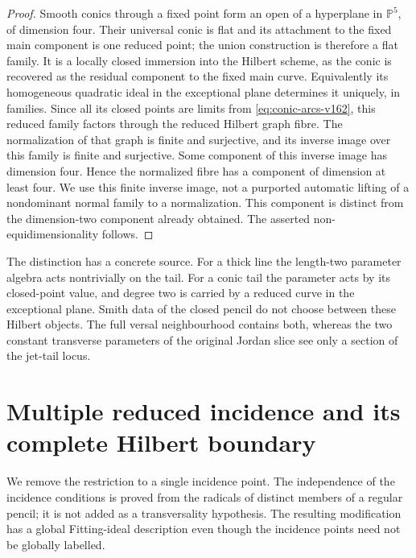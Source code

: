 \documentclass[11pt,reqno]{amsart}
\numberwithin{equation}{section}
\theoremstyle{definition}\newtheorem{definition}[theorem]{Definition}
\theoremstyle{remark}\newtheorem{remark}[theorem]{Remark}
\newcommand{\Pj}{\mathbb P}\newcommand{\A}{\mathbb A}
\begin{document}
\begin{proof}
Smooth conics through a fixed point form an open of a hyperplane
in $\Pj^5$, of dimension four. Their universal conic is flat and
its attachment to the fixed main component is one reduced point;
the union construction is therefore a flat family. It is a locally
closed immersion into the Hilbert scheme, as the conic is recovered
as the residual component to the fixed main curve. Equivalently its
homogeneous quadratic ideal in the exceptional plane determines it
uniquely, in families. Since all its closed points are limits from
\eqref{eq:conic-arcs-v162}, this reduced family factors through the
reduced Hilbert graph fibre. The normalization of that graph is
finite and surjective, and its inverse image over this family is
finite and surjective. Some component of this inverse image has
dimension four. Hence the normalized fibre has a component of
dimension at least four. We use this finite inverse image, not a
purported automatic lifting of a nondominant normal family to a
normalization. This component is distinct from the dimension-two
component already obtained. The asserted non-equidimensionality
follows.
\end{proof}

The distinction has a concrete source. For a thick line the length-two
parameter algebra acts nontrivially on the tail. For a conic tail the
parameter acts by its closed-point value, and degree two is carried
by a reduced curve in the exceptional plane. Smith data of the closed
pencil do not choose between these Hilbert objects. The full versal
neighbourhood contains both, whereas the two constant transverse
parameters of the original Jordan slice see only a section of the
jet-tail locus.


\section{Multiple reduced incidence and its complete Hilbert boundary}
\label{sec:multiple-incidence-v161}
We remove the restriction to a single incidence point. The independence
of the incidence conditions is proved from the radicals of distinct
members of a regular pencil; it is not added as a transversality
hypothesis. The resulting modification has a global Fitting-ideal
description even though the incidence points need not be globally
labelled.
\end{document}
